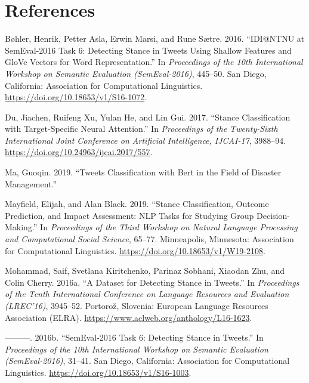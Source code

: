 \documentclass[]{article}
\begin{document}
\newpage

\hypertarget{references}{%
\section*{References}\label{references}}

\hypertarget{refs}{}
\leavevmode\hypertarget{ref-bohler-etal-2016-idi}{}%
Bøhler, Henrik, Petter Asla, Erwin Marsi, and Rune Sætre. 2016.
``IDI@NTNU at SemEval-2016 Task 6: Detecting Stance in Tweets Using
Shallow Features and GloVe Vectors for Word Representation.'' In
\emph{Proceedings of the 10th International Workshop on Semantic
Evaluation (SemEval-2016)}, 445--50. San Diego, California: Association
for Computational Linguistics.
\url{https://doi.org/10.18653/v1/S16-1072}.

\leavevmode\hypertarget{ref-ijcai2017-557}{}%
Du, Jiachen, Ruifeng Xu, Yulan He, and Lin Gui. 2017. ``Stance
Classification with Target-Specific Neural Attention.'' In
\emph{Proceedings of the Twenty-Sixth International Joint Conference on
Artificial Intelligence, IJCAI-17}, 3988--94.
\url{https://doi.org/10.24963/ijcai.2017/557}.

\leavevmode\hypertarget{ref-ma-unpublished}{}%
Ma, Guoqin. 2019. ``Tweets Classification with Bert in the Field of
Disaster Management.''

\leavevmode\hypertarget{ref-mayfield-black-2019-stance}{}%
Mayfield, Elijah, and Alan Black. 2019. ``Stance Classification, Outcome
Prediction, and Impact Assessment: NLP Tasks for Studying Group
Decision-Making.'' In \emph{Proceedings of the Third Workshop on Natural
Language Processing and Computational Social Science}, 65--77.
Minneapolis, Minnesota: Association for Computational Linguistics.
\url{https://doi.org/10.18653/v1/W19-2108}.

\leavevmode\hypertarget{ref-mohammad-etal-2016-dataset}{}%
Mohammad, Saif, Svetlana Kiritchenko, Parinaz Sobhani, Xiaodan Zhu, and
Colin Cherry. 2016a. ``A Dataset for Detecting Stance in Tweets.'' In
\emph{Proceedings of the Tenth International Conference on Language
Resources and Evaluation (LREC'16)}, 3945--52. Portorož, Slovenia:
European Language Resources Association (ELRA).
\url{https://www.aclweb.org/anthology/L16-1623}.

\leavevmode\hypertarget{ref-mohammad-etal-2016-semeval}{}%
---------. 2016b. ``SemEval-2016 Task 6: Detecting Stance in Tweets.''
In \emph{Proceedings of the 10th International Workshop on Semantic
Evaluation (SemEval-2016)}, 31--41. San Diego, California: Association
for Computational Linguistics.
\url{https://doi.org/10.18653/v1/S16-1003}.
\end{document}
